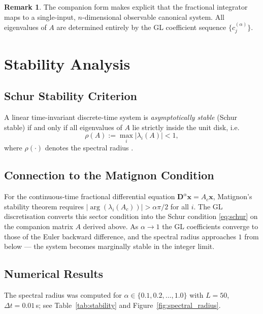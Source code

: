 \documentclass[11pt,a4paper]{article}
\theoremstyle{definition}
\newtheorem{remark}{Remark}[section]
\begin{document}
\begin{remark}
  The companion form makes explicit that the fractional integrator maps to a
  single-input, $n$-dimensional observable canonical system.  All
  eigenvalues of $A$ are determined entirely by the GL coefficient sequence
  $\{c_j^{(\alpha)}\}$.
\end{remark}

\section{Stability Analysis}
\label{sec:stability}

\subsection{Schur Stability Criterion}

A linear time-invariant discrete-time system is \emph{asymptotically stable}
(Schur stable) if and only if all eigenvalues of $A$ lie strictly inside the
unit disk, i.e.
\begin{equation}
  \rho(A) := \max_{i}|\lambda_i(A)| < 1,
  \label{eq:schur}
\end{equation}
where $\rho(\cdot)$ denotes the spectral radius \cite{chen_1984}.

\subsection{Connection to the Matignon Condition}

For the continuous-time fractional differential equation
$\bm{D}^{\alpha}\bm{x} = A_c\bm{x}$, Matignon's stability theorem
\cite{matignon_1996} requires
$|\arg(\lambda_i(A_c))| > \alpha\pi/2$ for all $i$.
The GL discretisation converts this sector condition into the Schur condition
\eqref{eq:schur} on the companion matrix $A$ derived above.  As $\alpha \to 1$
the GL coefficients converge to those of the Euler backward difference, and
the spectral radius approaches $1$ from below — the system becomes marginally
stable in the integer limit.

\subsection{Numerical Results}

The spectral radius was computed for $\alpha \in \{0.1, 0.2, \ldots, 1.0\}$
with $L = 50$, $\Delta t = 0.01$\,s; see Table~\ref{tab:stability} and
Figure~\ref{fig:spectral_radius}.
\end{document}
